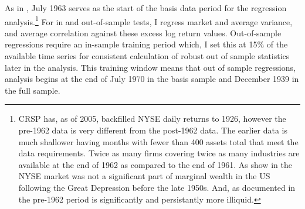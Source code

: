 As in \cite{pollet_average_2010}, July 1963 serves as the start of the basis data period for the regression analysis.\footnote{CRSP has, as of 2005, backfilled NYSE daily returns to 1926, however the pre-1962 data is very different from the post-1962 data. The earlier data is much shallower having months with fewer than 400 assets total that meet the data requirements. Twice as many firms covering twice as many industries are available at the end of 1962 as compared to the end of 1961. As show in \citet{taylor_2014} the NYSE market was not a significant part of marginal wealth in the US following the Great Depression before the late 1950s. And, as documented in \citet{jones_century_2002} the pre-1962 period is significantly and persistantly more illiquid.} For in and out-of-sample tests, I regress market and average variance, and average correlation against these excess log return values. Out-of-sample regressions require an in-sample training period which, I set this at 15\% of the available time series for consistent calculation of robust out of sample statistics later in the analysis. This training window means that out of sample regressions, analysis begins at the end of July 1970 in the basis sample and December 1939 in the
full sample.

